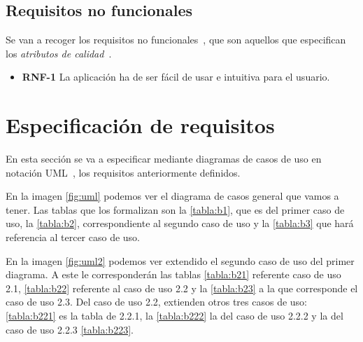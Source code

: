 \begin{itemize}
\begin{itemize}
\end{itemize}
\subsection{Requisitos no funcionales}
Se van a recoger los requisitos no funcionales~\cite{nofun}, que son aquellos que especifican los \textit{atributos de calidad}~\cite{atributo}.

\begin{itemize}
	\item \textbf{RNF-1} La aplicación ha de ser fácil de usar e intuitiva para el usuario.
\end{itemize}
\section{Especificación de requisitos}

En esta sección se va a especificar mediante diagramas de casos de uso en notación UML~\cite{uml}, los requisitos anteriormente definidos.

En la imagen \ref{fig:uml} podemos ver el diagrama de casos general que vamos a tener. Las tablas que los formalizan son la \ref{tabla:b1}, que es del primer caso de uso, la \ref{tabla:b2}, correspondiente al segundo caso de uso  y la \ref{tabla:b3} que hará referencia al tercer caso de uso.

 En la imagen \ref{fig:uml2} podemos ver extendido el segundo caso de uso del primer diagrama. A este le corresponderán las tablas \ref{tabla:b21} referente caso de uso 2.1, \ref{tabla:b22} referente al caso de uso 2.2 y la \ref{tabla:b23} a la que corresponde el caso de uso 2.3.
 Del caso de uso 2.2, extienden otros tres casos de uso: \ref{tabla:b221} es la tabla de 2.2.1, la \ref{tabla:b222} la del caso de uso 2.2.2 y la del caso de uso 2.2.3 \ref{tabla:b223}.









\end{itemize}
